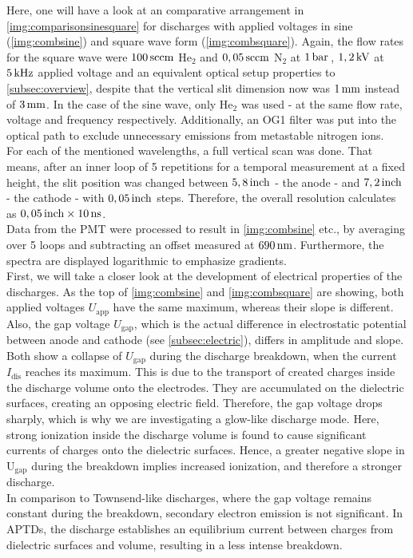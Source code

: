 \documentclass[a4paper,10pt,twoside]{article}
\newcommand{\ix}[1]{_\text{#1}}
\begin{document}
			\begin{multicols}{2}
				Here, one will have a look at an comparative arrangement in \autoref{img:comparisonsinesquare} for discharges with applied voltages in sine (\autoref{img:combsine}) and square wave form (\autoref{img:combsquare}). Again, the flow rates for the square wave were $\unit[100]{sccm}$ He$_2$ and $\unit[0,05]{sccm}$ N$_2$ at $\unit[1]{bar}$\,, $\unit[1,2]{kV}$ at $\unit[5]{kHz}$ applied voltage and an equivalent optical setup properties to \autoref{subsec:overview}, despite that the vertical slit dimension now was $\unit[1]{mm}$ instead of $\unit[3]{mm}$. In the case of the sine wave,	only He$_2$ was used - at the same flow rate, voltage and frequency respectively. Additionally, an OG1 filter was put into the optical path to exclude unnecessary emissions from metastable nitrogen ions.\\
				For each of the mentioned wavelengths, a full vertical scan was done. That means, after an inner loop of 5 repetitions for a temporal measurement at a fixed height, the slit position was changed between $\unit[5,8]{inch}$ - the anode - and $\unit[7,2]{inch}$ - the cathode - with $\unit[0,05]{inch}$ steps. Therefore, the overall resolution calculates as $\unit[0,05]{inch}\times\unit[10]{ns}$.\\
				Data from the PMT were processed to result in \autoref{img:combsine} etc., by averaging over 5 loops and subtracting an offset measured at $\unit[690]{nm}$. Furthermore, the spectra are displayed logarithmic to emphasize gradients.\\
				First, we will take a closer look at the development of electrical properties of the discharges. As the top of \autoref{img:combsine} and \autoref{img:combsquare} are showing, both applied voltages $U\ix{app}$ have the same maximum, whereas their slope is different. Also, the gap voltage $U\ix{gap}$, which is the actual difference in electrostatic potential between anode and cathode (see \autoref{subsec:electric}), differs in amplitude and slope. Both show a collapse of $U\ix{gap}$ during the discharge breakdown, when the current $I\ix{dis}$ reaches its maximum. This is due to the transport of created charges inside the discharge volume onto the electrodes. They are accumulated on the dielectric surfaces, creating an opposing electric field. Therefore, the gap voltage drops sharply, which is why we are investigating a glow-like discharge mode. Here, strong ionization inside the discharge volume is found to cause significant currents of charges onto the dielectric surfaces. Hence, a greater negative slope in U$\ix{gap}$ during the breakdown implies increased ionization, and therefore a stronger discharge.\\
				In comparison to Townsend-like discharges, where the gap voltage remains constant during the breakdown, secondary electron emission is not significant. In APTDs, the discharge establishes an equilibrium current between charges from dielectric surfaces and volume, resulting in a less intense breakdown.\\
			\end{multicols}
				
\end{document}
